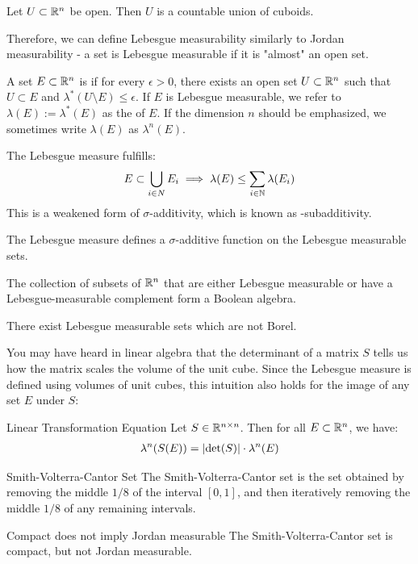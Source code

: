 \begin{theorem}
	Let $U \subset \mathbb{R}^n$ be open. Then $U$ is a countable union of cuboids.
\end{theorem}
Therefore, we can define Lebesgue measurability similarly to Jordan measurability - a set is Lebesgue measurable if it is "almost" an open set.
\begin{definition}
	A set $E \subset \mathbb{R}^n$ is  if for every $\epsilon > 0$, there exists an open set $U \subset \mathbb{R}^n$ such that $U \subset E$ and $\lambda^*(U \setminus E) \leq \epsilon$. If $E$ is Lebesgue measurable, we refer to $\lambda(E) := \lambda^*(E)$ as the  of $E$. If the dimension $n$ should be emphasized, we sometimes write $\lambda(E)$ as $\lambda^n(E)$.
\end{definition}
\begin{theorem}
	The Lebesgue measure fulfills:
	\begin{align*}
		E \subset \bigcup_{i \in N} E_i \implies \lambda(E) \leq \sum_{i \in \mathbb{N}} \lambda(E_i)
	\end{align*}
	This is a weakened form of $\sigma$-additivity, which is known as \tbf{$\sigma$}-subadditivity.
\end{theorem}
\begin{theorem}
	The Lebesgue measure defines a $\sigma$-additive function on the Lebesgue measurable sets.
\end{theorem}
\begin{theorem}
	The collection of subsets of $\mathbb{R}^n$ that are either Lebesgue measurable or have a Lebesgue-measurable complement form a Boolean algebra.
\end{theorem}
\begin{theorem}
	There exist Lebesgue measurable sets which are not Borel.
\end{theorem}

\clearpage
You may have heard in linear algebra that the determinant of a matrix $S$ tells us how the matrix scales the volume of the unit cube. Since the Lebesgue measure is defined using volumes of unit cubes, this intuition also holds for the image of any set $E$ under $S$:
\begin{importanttheorem}{Linear Transformation Equation}{}
	\label{thm:lineartransformationequation}
	Let $S \in \mathbb{R}^{n \times n}$. Then for all $E \subset \mathbb{R}^n$, we have:
	\begin{align*}
		\lambda^n(S(E)) = \abs{\det(S)} \cdot \lambda^n(E)
	\end{align*}
\end{importanttheorem}
\begin{importantdefinition}{Smith-Volterra-Cantor Set}{}
	The Smith-Volterra-Cantor set is the set obtained by removing the middle $1/8$ of the interval $[0,1]$, and then iteratively removing the middle $1/8$ of any remaining intervals.
\end{importantdefinition}
\begin{importanttheorem}{Compact does not imply Jordan measurable}{}
	The Smith-Volterra-Cantor set is compact, but not Jordan measurable.
\end{importanttheorem}
